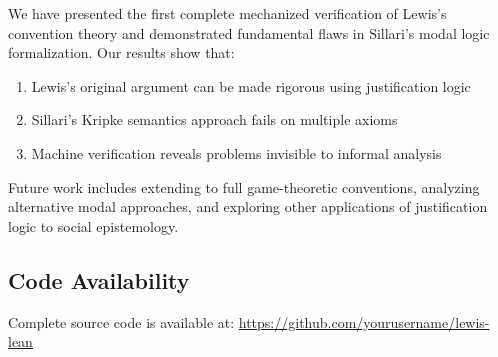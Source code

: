 \documentclass[11pt]{article}
\begin{document}
We have presented the first complete mechanized verification of Lewis's convention 
theory and demonstrated fundamental flaws in Sillari's modal logic formalization. 
Our results show that:

\begin{enumerate}
\item Lewis's original argument can be made rigorous using justification logic
\item Sillari's Kripke semantics approach fails on multiple axioms
\item Machine verification reveals problems invisible to informal analysis
\end{enumerate}

Future work includes extending to full game-theoretic conventions, analyzing 
alternative modal approaches, and exploring other applications of justification 
logic to social epistemology.

\subsection{Code Availability}

Complete source code is available at: \url{https://github.com/yourusername/lewis-lean}



\end{document}
